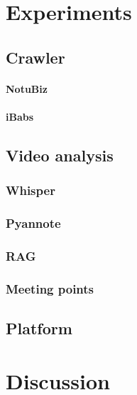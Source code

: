 \documentclass[twoside]{uva-inf-bachelor-thesis}
\begin{document}
\chapter{Experiments}
\section{Crawler}
\subsubsection{NotuBiz}

\subsubsection{iBabs}


\section{Video analysis}
\subsection{Whisper}

\subsection{Pyannote}

\subsection{RAG}

\subsection{Meeting points}

\section{Platform}

\chapter{Discussion}

\printbibliography
\end{document}
